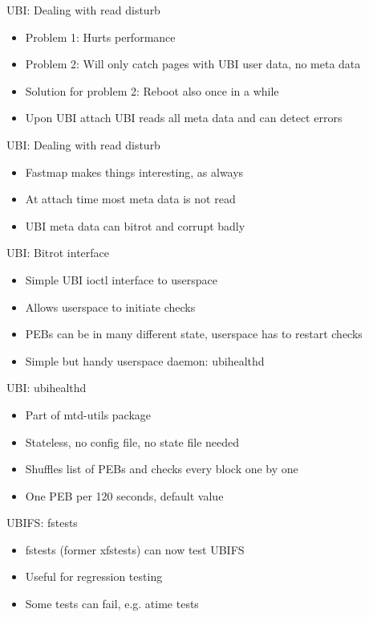 \documentclass[aspectratio=169,obeyspaces,spaces,hyphens,dvipsnames]{beamer}
\begin{document}
\begin{frame}{UBI: Dealing with read disturb}
  \begin{itemize}
    \item Problem 1: Hurts performance
    \item Problem 2: Will only catch pages with UBI user data, no meta data
    \item Solution for problem 2: Reboot also once in a while
    \item Upon UBI attach UBI reads all meta data and can detect errors
  \end{itemize}
\end{frame}

\begin{frame}{UBI: Dealing with read disturb}
  \begin{itemize}
    \item Fastmap makes things interesting, as always
    \item At attach time most meta data is not read
    \item UBI meta data can bitrot and corrupt badly
  \end{itemize}
\end{frame}

\begin{frame}{UBI: Bitrot interface}
  \begin{itemize}
   \item Simple UBI ioctl interface to userspace
   \item Allows userspace to initiate checks
   \item PEBs can be in many different state, userspace has to restart checks
   \item Simple but handy userspace daemon: ubihealthd
  \end{itemize}
\end{frame}

\begin{frame}{UBI: ubihealthd}
  \begin{itemize}
   \item Part of mtd-utils package
   \item Stateless, no config file, no state file needed
   \item Shuffles list of PEBs and checks every block one by one
   \item One PEB per 120 seconds, default value
  \end{itemize}
\end{frame}

\begin{frame}{UBIFS: fstests}
  \begin{itemize}
   \item fstests (former xfstests) can now test UBIFS
   \item Useful for regression testing
   \item Some tests can fail, e.g. atime tests
  \end{itemize}
\end{frame}
\end{document}
